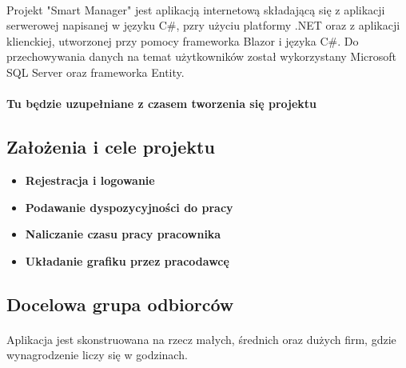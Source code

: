 \documentclass[12pt,a4paper]{article}
\begin{document}
\paragraph{ }Projekt "Smart Manager" jest aplikacją internetową składającą się z aplikacji serwerowej napisanej w języku C\#, pzry użyciu platformy .NET oraz z aplikacji klienckiej, utworzonej przy pomocy frameworka Blazor i języka C\#. Do przechowywania danych na temat użytkowników został wykorzystany Microsoft SQL Server oraz frameworka Entity.
\paragraph{Tu będzie uzupełniane z czasem tworzenia się projektu}
\subsection{Założenia i cele projektu}
\begin{itemize}
    \item \textbf{Rejestracja i logowanie}
    \item \textbf{Podawanie dyspozycyjności do pracy}
    \item \textbf{Naliczanie czasu pracy pracownika}
    \item \textbf{Układanie grafiku przez pracodawcę}
\end{itemize}
\subsection{Docelowa grupa odbiorców}
\paragraph{ }Aplikacja jest skonstruowana na rzecz małych, średnich oraz dużych firm, gdzie wynagrodzenie liczy się w godzinach.
\end{document}

